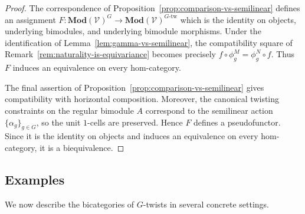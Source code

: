 \documentclass[11pt,oneside]{amsart}
\numberwithin{equation}{section}
\numberwithin{figure}{section}
\theoremstyle{plain}
\theoremstyle{definition}
\theoremstyle{remark}
\begin{document}
 
\begin{proof}
The correspondence of
Proposition~\ref{prop:comparison-vs-semilinear} defines an assignment
\(
F\colon
\mathbf{Mod}(\mathcal V)^G
\to
\mathbf{Mod}(\mathcal V)^{G\text{-tw}}
\)
which is the identity on objects, underlying bimodules, and underlying
bimodule morphisms. Under the identification of
Lemma~\ref{lem:gamma-vs-semilinear}, the compatibility square of
Remark~\ref{rem:naturality-is-equivariance} becomes precisely
\(
f\circ\phi_g^M=\phi_g^N\circ f.
\)
Thus \(F\) induces an equivalence on every hom-category.

The final assertion of
Proposition~\ref{prop:comparison-vs-semilinear} gives compatibility
with horizontal composition. Moreover, the canonical twisting
constraints on the regular bimodule \(A\) correspond to the
semilinear action \(\{\alpha_g\}_{g\in G}\), so the unit \(1\)-cells
are preserved. Hence \(F\) defines a pseudofunctor. Since it is the
identity on objects and induces an equivalence on every hom-category,
it is a biequivalence.
\end{proof}

 
\subsection{Examples}
\label{subsec:G-twist-examples}
We now describe the bicategories of \(G\)-twists in several concrete
settings.
\end{document}
